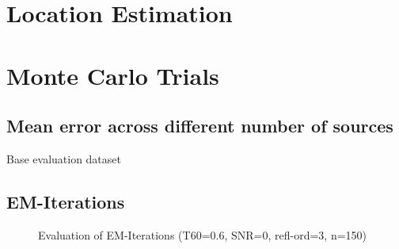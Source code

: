\section{Location Estimation}
\section{Monte Carlo Trials}
\subsection*{Mean error across different number of sources}

%		
%
\begin{table}[H]
	\centering
	
	\caption{Base evaluation dataset}
\end{table}

\setcounter{topnumber}{2}
\setcounter{bottomnumber}{2}
\setcounter{totalnumber}{4}
\renewcommand{\topfraction}{0.85}
\renewcommand{\bottomfraction}{0.85}
\renewcommand{\textfraction}{0.15}
\renewcommand{\floatpagefraction}{0.8}
\renewcommand{\textfraction}{0.1}
\setlength{\floatsep}{5pt plus 2pt minus 2pt}
\setlength{\textfloatsep}{5pt plus 2pt minus 2pt}
\setlength{\intextsep}{5pt plus 2pt minus 2pt}

\subsection*{EM-Iterations}
\begin{figure}[!htp]
    \centering
    \begin{subfigure}{0.49\textwidth}
          \centering
	       
%            
	\end{subfigure}
    \begin{subfigure}{0.49\textwidth}
          \centering
	       
%            
	\end{subfigure}
\caption{Evaluation of EM-Iterations (T60=0.6, SNR=0, refl-ord=3, n=150)}
\end{figure}

